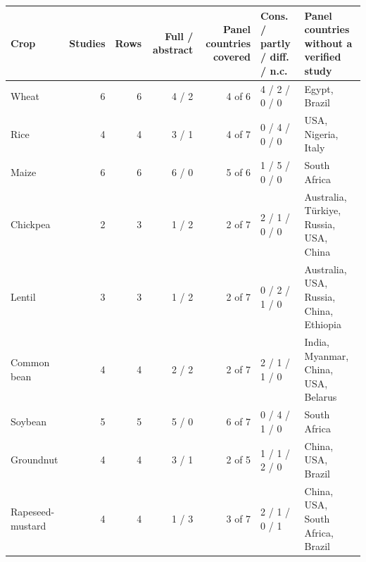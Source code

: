 \begin{tabular}{@{}lrrrrlp{4.4cm}@{}}
\toprule
Crop & Studies & Rows & Full / abstract & Panel countries covered & Cons. / partly / diff. / n.c. & Panel countries without a verified study \\
\midrule
Wheat & 6 & 6 & 4 / 2 & 4 of 6 & 4 / 2 / 0 / 0 & Egypt, Brazil \\
Rice & 4 & 4 & 3 / 1 & 4 of 7 & 0 / 4 / 0 / 0 & USA, Nigeria, Italy \\
Maize & 6 & 6 & 6 / 0 & 5 of 6 & 1 / 5 / 0 / 0 & South Africa \\
Chickpea & 2 & 3 & 1 / 2 & 2 of 7 & 2 / 1 / 0 / 0 & Australia, T\"urkiye, Russia, USA, China \\
Lentil & 3 & 3 & 1 / 2 & 2 of 7 & 0 / 2 / 1 / 0 & Australia, USA, Russia, China, Ethiopia \\
Common bean & 4 & 4 & 2 / 2 & 2 of 7 & 2 / 1 / 1 / 0 & India, Myanmar, China, USA, Belarus \\
Soybean & 5 & 5 & 5 / 0 & 6 of 7 & 0 / 4 / 1 / 0 & South Africa \\
Groundnut & 4 & 4 & 3 / 1 & 2 of 5 & 1 / 1 / 2 / 0 & China, USA, Brazil \\
Rapeseed-mustard & 4 & 4 & 1 / 3 & 3 of 7 & 2 / 1 / 0 / 1 & China, USA, South Africa, Brazil \\
\bottomrule
\end{tabular}
